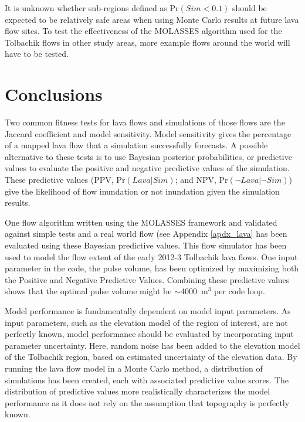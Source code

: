 	It is unknown whether sub-regions defined as $\text{Pr}(Sim<0.1)$ should be expected to be relatively safe areas when using Monte Carlo results at future lava flow sites. To test the effectiveness of the MOLASSES algorithm used for the Tolbachik flows in other study areas, more example flows around the world will have to be tested.
		
		
\section{Conclusions}
	Two common fitness tests for lava flows and simulations of those flows are the Jaccard coefficient and model sensitivity. Model sensitivity gives the percentage of a mapped lava flow that a simulation successfully forecasts. A possible alternative to these tests is to use Bayesian posterior probabilities, or predictive values to evaluate the positive and negative predictive values of the simulation. These predictive values (PPV, $\text{Pr}(Lava|Sim)$; and NPV, $\text{Pr}(\neg Lava|\neg Sim)$) give the likelihood of flow inundation or not inundation given the simulation results.
	
	One flow algorithm written using the MOLASSES framework and validated against simple tests and a real world flow (see Appendix \ref{apdx_lava} has been evaluated using these Bayesian predictive values. This flow simulator has been used to model the flow extent of the early 2012-3 Tolbachik lava flows. One input parameter in the code, the pulse volume, has been optimized by maximizing both the Positive and Negative Predictive Values. Combining these predictive values shows that the optimal pulse volume might be $\sim$4000~m$^3$ per code loop.
	
	Model performance is fundamentally dependent on model input parameters. As input parameters, such as the elevation model of the region of interest, are not perfectly known, model performance should be evaluated by incorporating input parameter uncertainty. Here, random noise has been added to the elevation model of the Tolbachik region, based on estimated uncertainty of the elevation data. By running the lava flow model in a Monte Carlo method, a distribution of simulations has been created, each with associated predictive value scores. The distribution of predictive values more realistically characterizes the model performance as it does not rely on the assumption that topography is perfectly known.
	
